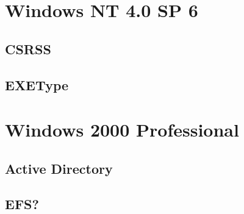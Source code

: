 \section{Windows NT 4.0 SP 6}

	\subsection{CSRSS}
	\subsection{EXEType}

\section{Windows 2000 Professional}

	\subsection{Active Directory}
	\subsection{EFS?}


